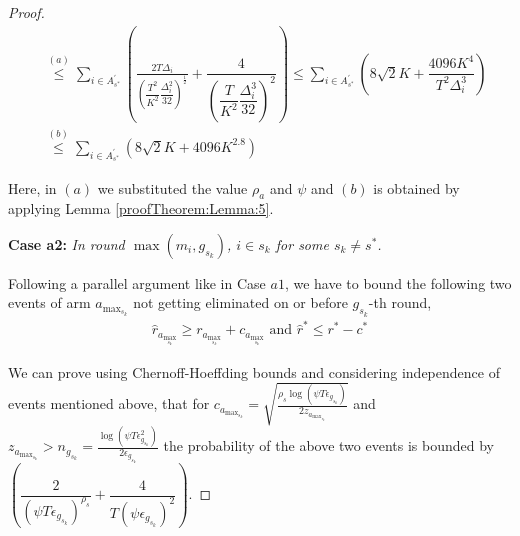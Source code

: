 \begin{proof}
\begin{align*}
&\overset{(a)}{\leq} \sum_{i\in A_{s^{*}}^{'}}\left(\frac{2T\Delta_{i}}{(\dfrac{T^2}{K^2}\dfrac{\Delta_{i}^{2}}{32})^{\frac{1}{2}}} + \dfrac{4}{(\dfrac{T}{K^2} \dfrac{\Delta_{i}^{3}}{32})^2}\right)  \leq \sum_{i\in A_{s^{*}}^{'}}\left(8\sqrt{2} K + \dfrac{4096 K^4}{T^2 \Delta_i^3}\right)\\
&\overset{(b)}{\leq}  \sum_{i\in A_{s^{*}}^{'}}\left(8\sqrt{2} K + 4096 K^{2.8}\right)
   \end{align*}
   
  Here, in $(a)$ we substituted the value $\rho_a$ and $\psi$ and $(b)$ is obtained by applying Lemma  \ref{proofTheorem:Lemma:5}.




\textbf{Case a2:} \textit{In round $\max(m_{i},g_{s_{k}})$, ${i} \in s_k$ for some $s_k \ne s^{*}$.}

Following a parallel argument like in Case $a1$, we have to bound the following two events of arm $a_{\max_{s_{k}}}$ not getting eliminated on or before $g_{s_{k}}$-th round,
\begin{align*}
  \hat{r}_{a_{\max_{s_{k}}}} \geq r_{a_{\max_{s_{k}}}} +c_{a_{\max_{s_{k}}}} \text{ and } \hat{r}^{*} \leq r^{*} - c^{*} 
\end{align*} 

We can prove using Chernoff-Hoeffding bounds and considering independence of events mentioned above, that for $c_{a_{\max_{s_{k}}}}=\sqrt{\frac{\rho_{s} \log (\psi T\epsilon_{g_{s_{k}}})}{2 z_{a_{\max_{s_{k}}}}}}$ and  $z_{a_{\max_{s_{k}}}} > n_{g_{s_{k}}}=\frac{\log{(\psi T\epsilon_{g_{s_{k}}}^{2})}}{2\epsilon_{g_{s_{k}}}}$ the probability of the above two events is bounded by $\left(\dfrac{2}{(\psi T\epsilon_{g_{s_{k}}})^{\rho_{s}}} + \dfrac{4}{T(\psi \epsilon_{g_{s_k}})^2}\right)$.


\end{proof}
